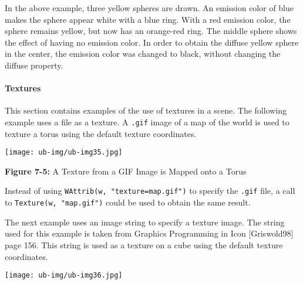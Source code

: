 \bigskip


In the above example, three yellow spheres are drawn. An emission
color of blue makes the sphere appear white with a blue ring. With a
red emission color, the sphere remains yellow, but now has an
orange-red ring. The middle sphere shows the effect of having no
emission color. In order to obtain the diffuse yellow sphere in the
center, the emission color was changed to black, without changing the
diffuse property.

\paragraph{Textures}
This section contains examples of the use of textures in a scene. The
following example uses a file as a texture. A \texttt{.gif} image of a
map of the world is used to texture a torus using the default texture
coordinates.

\bigskip

{\centering 
\texttt{[image: ub-img/ub-img35.jpg]}
\par}

{\sffamily\bfseries Figure 7-5:}
{\sffamily A Texture from a GIF Image is Mapped onto a Torus}


Instead of using \texttt{WAttrib(w, "texture=map.gif")} to specify the
\texttt{.gif} file, a call to \texttt{Texture(w, "map.gif")} could be
used to obtain the same result.

The next example uses an image string to specify a texture image. The
string used for this example is taken from Graphics Programming in
Icon [Griswold98] page 156. This string is used as a texture on a cube
using the default texture coordinates.

\bigskip

{\centering 
\texttt{[image: ub-img/ub-img36.jpg]}
\par}

